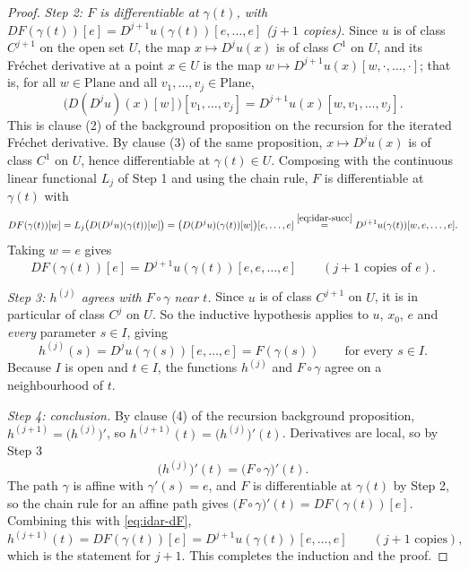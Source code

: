 \begin{proof}
\emph{Step 2: $F$ is differentiable at $\gamma(t)$, with $DF(\gamma(t))[e]
=D^{j+1}u(\gamma(t))[e,\ldots,e]$ ($j+1$ copies).}
Since $u$ is of class $C^{j+1}$ on the open set $U$, the map $x\mapsto D^{j}u(x)$ is of class
$C^{1}$ on $U$, and its Fr\'echet derivative at a point $x\in U$ is the map
$w\mapsto D^{j+1}u(x)[w,\cdot,\ldots,\cdot]$; that is, for all $w\in\mathrm{Plane}$ and all
$v_1,\ldots,v_j\in\mathrm{Plane}$,
\begin{equation}\label{eq:idar-succ}
  \bigl(D(D^{j}u)(x)[w]\bigr)[v_1,\ldots,v_j]=D^{j+1}u(x)[w,v_1,\ldots,v_j].
\end{equation}
This is clause (2) of the background proposition on the recursion for the iterated Fr\'echet
derivative.  By clause (3) of the same proposition, $x\mapsto D^{j}u(x)$ is of class $C^{1}$
on $U$, hence differentiable at $\gamma(t)\in U$.
Composing with the continuous linear functional $L_j$ of Step 1 and using the chain rule, $F$
is differentiable at $\gamma(t)$ with
\[
  DF(\gamma(t))[w]=L_j\bigl(D(D^{j}u)(\gamma(t))[w]\bigr)
  =\bigl(D(D^{j}u)(\gamma(t))[w]\bigr)[e,\ldots,e]
  \overset{\eqref{eq:idar-succ}}{=}D^{j+1}u(\gamma(t))[w,e,\ldots,e].
\]
Taking $w=e$ gives
\begin{equation}\label{eq:idar-dF}
  DF(\gamma(t))[e]=D^{j+1}u(\gamma(t))[e,e,\ldots,e]\qquad(j+1\text{ copies of }e).
\end{equation}

\emph{Step 3: $h^{(j)}$ agrees with $F\circ\gamma$ near $t$.}
Since $u$ is of class $C^{j+1}$ on $U$, it is in particular of class $C^{j}$ on $U$.  So the
inductive hypothesis applies to $u$, $x_0$, $e$ and \emph{every} parameter $s\in I$, giving
\[
  h^{(j)}(s)=D^{j}u(\gamma(s))[e,\ldots,e]=F(\gamma(s))\qquad\text{for every }s\in I.
\]
Because $I$ is open and $t\in I$, the functions $h^{(j)}$ and $F\circ\gamma$ agree on a
neighbourhood of $t$.

\emph{Step 4: conclusion.}
By clause (4) of the recursion background proposition,
$h^{(j+1)}=\bigl(h^{(j)}\bigr)'$, so
$h^{(j+1)}(t)=\bigl(h^{(j)}\bigr)'(t)$.  Derivatives are local, so by Step 3
\[
  \bigl(h^{(j)}\bigr)'(t)=\bigl(F\circ\gamma\bigr)'(t).
\]
The path $\gamma$ is affine with $\gamma'(s)=e$, and $F$ is differentiable at $\gamma(t)$ by
Step 2, so the chain rule for an affine path gives
$\bigl(F\circ\gamma\bigr)'(t)=DF(\gamma(t))[e]$.  Combining this with \eqref{eq:idar-dF},
\[
  h^{(j+1)}(t)=DF(\gamma(t))[e]=D^{j+1}u(\gamma(t))[e,\ldots,e]\qquad(j+1\text{ copies}),
\]
which is the statement for $j+1$.  This completes the induction and the proof.
\end{proof}
